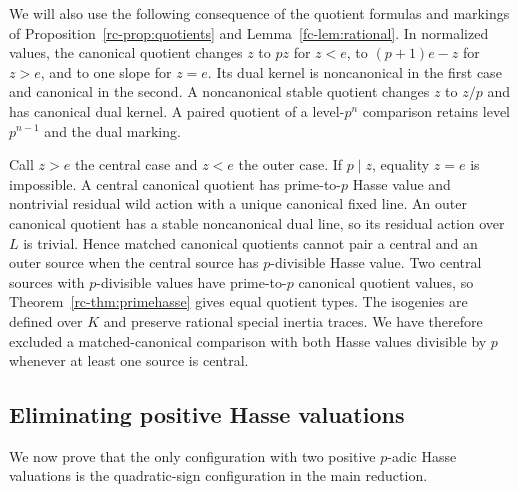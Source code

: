 We will also use the following consequence of the quotient formulas and markings of Proposition~\ref{rc-prop:quotients} and Lemma~\ref{fc-lem:rational}. In normalized values, the canonical quotient changes $z$ to $pz$ for $z<e$, to $(p+1)e-z$ for $z>e$, and to one slope for $z=e$. Its dual kernel is noncanonical in the first case and canonical in the second. A noncanonical stable quotient changes $z$ to $z/p$ and has canonical dual kernel. A paired quotient of a level-$p^n$ comparison retains level $p^{n-1}$ and the dual marking.

Call $z>e$ the central case and $z<e$ the outer case. If $p\mid z$, equality $z=e$ is impossible. A central canonical quotient has prime-to-$p$ Hasse value and nontrivial residual wild action with a unique canonical fixed line. An outer canonical quotient has a stable noncanonical dual line, so its residual action over $L$ is trivial. Hence matched canonical quotients cannot pair a central and an outer source when the central source has $p$-divisible Hasse value. Two central sources with $p$-divisible values have prime-to-$p$ canonical quotient values, so Theorem~\ref{rc-thm:primehasse} gives equal quotient types. The isogenies are defined over $K$ and preserve rational special inertia traces. We have therefore excluded a matched-canonical comparison with both Hasse values divisible by $p$ whenever at least one source is central.

\subsection{Eliminating positive Hasse valuations}
We now prove that the only configuration with two positive $p$-adic Hasse valuations is the quadratic-sign configuration in the main reduction.

